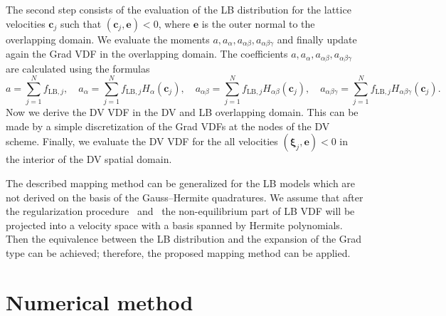 \documentclass{elsarticle} %
\newcommand{\Set}[2]{\{\,{#1}:{#2}\,\}}
\newcommand{\bxi}{\boldsymbol{\xi}}
\newcommand{\bc}{\boldsymbol{c}}
\newcommand{\LB}{\mathrm{LB}\!}
\newcommand{\ai}{a_{\alpha}}
\newcommand{\aij}{a_{\alpha\beta}}
\newcommand{\aijk}{a_{\alpha\beta\gamma}}
\newcommand{\Hi}{H_{\alpha}}
\newcommand{\Hij}{H_{\alpha\beta}}
\newcommand{\Hijk}{H_{\alpha\beta\gamma}}
\begin{document}
The second step consists of the evaluation of the LB distribution for the lattice velocities $\bc_j$
such that $(\bc_j,\mathbf{e})<0$, where $\mathbf{e}$ is the outer normal to the overlapping domain.
We evaluate the moments $a,\ai,\aij,\aijk$ and finally update again the Grad VDF in the overlapping domain.
The coefficients $a,\ai,\aij, \aijk$ are calculated using the formulas
\begin{equation}
    a=\sum_{j=1}^N f_{\LB,j}, \quad
    \ai=\sum_{j=1}^N f_{\LB,j}\Hi(\bc_j), \quad
    \aij=\sum_{j=1}^N f_{\LB,j}\Hij(\bc_j), \quad
    \aijk=\sum_{j=1}^N f_{\LB,j}\Hijk(\bc_j).
\end{equation}
Now we derive the DV VDF in the DV and LB overlapping domain.
This can be made by a simple discretization of the Grad VDFs at the nodes of the DV scheme.
Finally, we evaluate the DV VDF for the all velocities $(\bxi_j,\mathbf{e})<0$
in the interior of the DV spatial domain.

The described mapping method can be generalized for the LB models
which are not derived on the basis of the Gauss--Hermite quadratures.
We assume that after the regularization procedure~\cite{Latt2006, Chen2006} and~\cite{Zhang2006, Mont2015, Mattila2017}
the non-equilibrium part of LB VDF will be projected into a velocity space with a basis spanned by Hermite polynomials.
Then the equivalence between the LB distribution and the expansion of the Grad type can be achieved;
therefore, the proposed mapping method can be applied.

\section{Numerical method}\label{sec:numerics}



\end{document}
